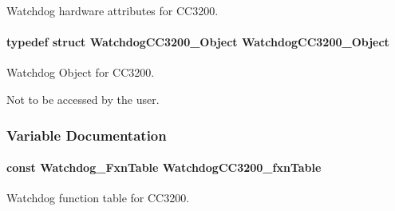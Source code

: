 Watchdog hardware attributes for C\-C3200. 

\paragraph[{Watchdog\-C\-C3200\-\_\-\-Object}]{\setlength{\rightskip}{0pt plus 5cm}typedef struct {\bf Watchdog\-C\-C3200\-\_\-\-Object}  {\bf Watchdog\-C\-C3200\-\_\-\-Object}}\label{_watchdog_c_c3200_8h_acac7932b9436e05c5f1a1901739cad15}


Watchdog Object for C\-C3200. 

Not to be accessed by the user. 

\subsubsection{Variable Documentation}
\paragraph[{Watchdog\-C\-C3200\-\_\-fxn\-Table}]{\setlength{\rightskip}{0pt plus 5cm}const {\bf Watchdog\-\_\-\-Fxn\-Table} Watchdog\-C\-C3200\-\_\-fxn\-Table}\label{_watchdog_c_c3200_8h_aa8da6260d2ca5dbe363e6d82748e9375}


Watchdog function table for C\-C3200. 

